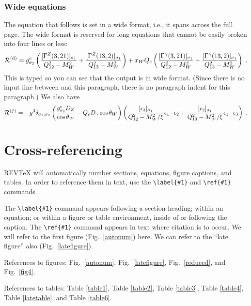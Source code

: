 \subsubsection{Wide equations}
The equation that follows is set in a wide format, i.e., it
spans across the full page.  The wide format is reserved for
long equations that cannot be easily broken into four lines or less:
\widetext
\begin{equation}
{\cal R}^{(\rm d)}=
 g_{\sigma_2}^e\left({[\Gamma^Z(3,21)]_{\sigma_1}\over
Q_{12}^2-M_W^2}+{[\Gamma^Z(13,2)]_{\sigma_1}\over Q_{13}^2-M_W^2}
\right) +x_WQ_e\left({[\Gamma^\gamma(3,21)]_{\sigma_1}\over
Q_{12}^2-M_W^2}+{[\Gamma^\gamma(13,2)]_{\sigma_1}
\over Q_{13}^2-M_W^2} \right)\;. \label{wideeq}
\end{equation}
This is typed so you can see that the output
is in wide format.  (Since
there is no input line between 
and this paragraph,
there is no paragraph indent for this paragraph.) We also have
\begin{equation}
{\cal R}^{(f)}=-g^3\delta_{\sigma_1,\sigma_2}
\left( {g^e_{\sigma_2}D_Z\over\cos\theta_W}-Q_eD_\gamma
\cos\theta_W \right)
\left( {[\epsilon_3]_{\sigma_1}\over
Q^2_{12}-M^2_W/\xi}\epsilon_1\cdot\epsilon_2+
{[\epsilon_2]_{\sigma_1}\over
Q^2_{13}-M^2_W/\xi}\epsilon_1\cdot\epsilon_3 \right)\;.
\end{equation}

\narrowtext
\section{Cross-referencing}
REV\TeX{} will automatically number sections, equations,
figure captions, and tables. In order to
reference them in text, use the \verb+\label{#1}+ and \verb+\ref{#1}+
commands.

The \verb+\label{#1}+ command appears following a section heading;
within an equation; or within a figure
or table environment, inside of or following the caption.
The \verb+\ref{#1}+ command appears in text
where citation is to occur.  We will refer to the first
figure (Fig.~\ref{autonum}) here.
We can refer to the ``late figure'' also (Fig.~\ref{latefigure}).

References to figures: Fig.~\ref{autonum}, Fig.~\ref{latefigure},
Fig.~\ref{reduced}, and Fig.~\ref{fig4}.

References to tables:
Table \ref{table1},
Table \ref{table2},
Table \ref{table3},
Table \ref{table4},
Table \ref{latetable}, and
Table \ref{table6}.

